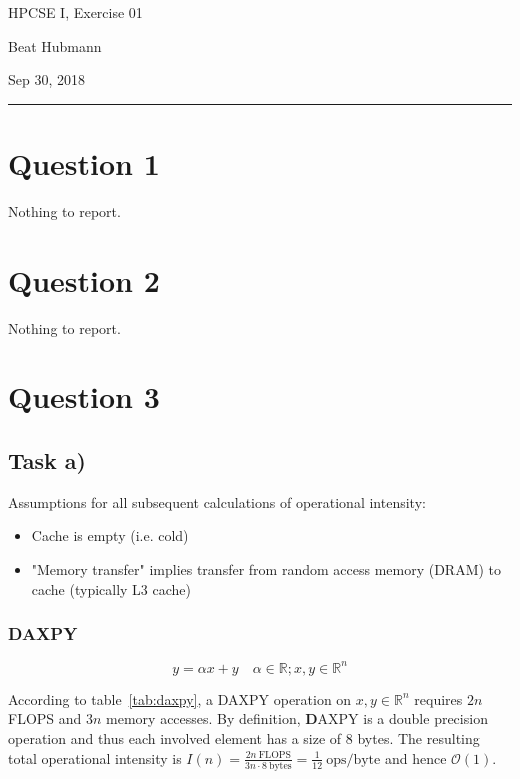 \documentclass[11pt,a4paper]{article}
\begin{document}
\noindent\parbox{\linewidth}{
 \parbox{.25\linewidth}{ \large HPCSE I, Exercise 01 }\hfill
 \parbox{.5\linewidth}{\begin{center} \large Beat Hubmann \end{center}}\hfill
 \parbox{.2\linewidth}{\begin{flushright} \large Sep 30, 2018 \end{flushright}}
}
\noindent\rule{\linewidth}{2pt}

\section{Question 1}
Nothing to report.

\section{Question 2}
Nothing to report.

\section{Question 3}

\subsection{Task a)}
Assumptions for all subsequent calculations of operational intensity:
\begin{itemize}
\item{Cache is empty (i.e. cold)}
\item{"Memory transfer" implies transfer from random access memory (DRAM) to cache (typically L3 cache)}
\end{itemize}

\subsubsection{DAXPY}

\begin{equation}
y = \alpha x + y \quad \alpha \in \mathbb{R}; x, y \in \mathbb{R}^{n}
\end{equation}

According to table~\ref{tab:daxpy}, a DAXPY operation on $x, y \in \mathbb{R}^{n}$ requires $2n$ FLOPS and $3n$ memory accesses. By definition, \textbf{D}AXPY is a double precision operation and thus each involved element has a size of 8 bytes. The resulting total operational intensity is $I(n) = \frac{2n \: \text{FLOPS}}{3n \cdot 8 \: \text{bytes}} = \frac{1}{12} \: \text{ops/byte}$ and hence $\mathcal{O}(1)$.
\end{document}
